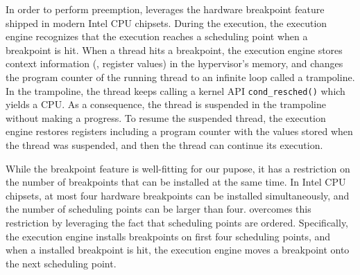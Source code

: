 




%
In order to perform preemption, \sys leverages the hardware breakpoint
feature~\cite{hwbp} shipped in modern Intel CPU chipsets.
%
During the execution, the execution engine recognizes that the
execution reaches a scheduling point when a breakpoint is hit.
%
When a thread hits a breakpoint, the execution engine stores context
information (\eg, register values) in the hypervisor's memory, and
changes the program counter of the running thread to an infinite loop
called a trampoline.
%
In the trampoline, the thread keeps calling a kernel API
\texttt{cond_resched()} which yields a CPU. As a consequence, the
thread is suspended in the trampoline without making a progress.
%
To resume the suspended thread, the execution engine restores
registers including a program counter with the values stored when the
thread was suspended, and then the thread can continue its execution.






%
While the breakpoint feature is well-fitting for our pupose, it has a
restriction on the number of breakpoints that can be installed at the
same time.
%
In Intel CPU chipsets, at most four hardware breakpoints can be
installed simultaneously, and the number of scheduling points can be
larger than four.
%
\sys overcomes this restriction by leveraging the fact that scheduling
points are ordered. Specifically, the execution engine installs
breakpoints on first four scheduling points, and when a installed
breakpoint is hit, the execution engine moves a breakpoint onto the
next scheduling point.
%



%
%





